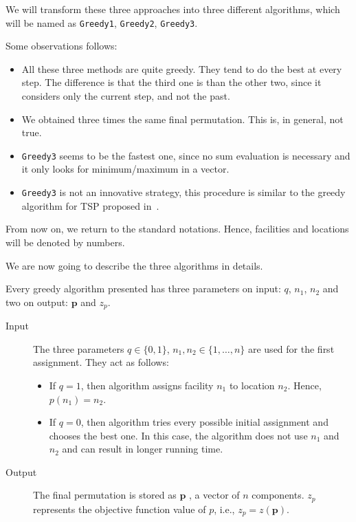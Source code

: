 We will transform these three approaches into three different algorithms, which will be named as \texttt{Greedy1}, \texttt{Greedy2}, \texttt{Greedy3}.

Some observations follows:
\begin{itemize}
	\item All these three methods are quite greedy. They tend to do the best at every step. The difference is that the third one is  than the other two, since it considers only the current step, and not the past.
	\item We obtained three times the same final permutation. This is, in general, not true.
	\item \texttt{Greedy3} seems to be the fastest one, since no sum evaluation is necessary and it only looks for minimum/maximum in a vector.
	\item \texttt{Greedy3} is not an innovative strategy, this procedure is similar to the greedy algorithm for TSP proposed in~\cite{Kim2001}.
\end{itemize}





From now on, we return to the standard notations. Hence, facilities and locations will be denoted by numbers.

We are now going to describe the three algorithms in details.


Every greedy algorithm presented has three parameters on input: $q$, $n_1$, $n_2$ and two on output: $\bm p$ and $z_p$. 


\begin{description}
	\item[Input]The three parameters $q\in\{0,1\}$, $n_1,n_2\in\{1,\dots,n\}$ are used for the first assignment. They act as follows: \begin{itemize}
		\item If $q=1$, then algorithm assigns facility $n_1$ to location $n_2$. Hence, $ p(n_1)=n_2$.
		\item If $q=0$, then algorithm tries every possible initial assignment and chooses the best one. In this case, the algorithm does not use $n_1$ and $n_2$ and  can result in longer running time.
	\end{itemize}
	\item[Output] The final permutation is stored as $\bm p$ , a vector of $n$ components. 	$z_p$ represents the objective function value of $p$, i.e., $z_p = z(\bm p)$.

\end{description}


